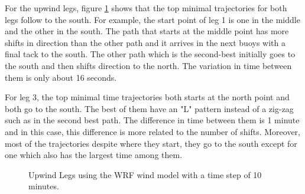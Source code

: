 For the upwind legs, figure \ref{fig:Windnetcdf_upwind} shows that the top minimal trajectories for both legs follow to the south. For example, the start point of leg 1 is one in the middle and the other in the south. The path that starts at the middle point has more shifts in direction than the other path and it arrives in the next buoys with a final tack to the south. The other path which is the second-best initially goes to the south and then shifts direction to the north. The variation in time between them is only about 16 seconds. \par \noindent 

For leg 3, the top minimal time trajectories both starts at the north point and both go to the south. The best of them have an "L" pattern instead of a zig-zag such as in the second best path. The difference in time between them is 1 minute and in this case, this difference is more related to the number of shifts. Moreover, most of the trajectories despite where they start, they go to the south except for one which also has the largest time among them. \par  %

\begin{figure} [hbt!]
  \centering
  \hfill
  \caption{Upwind Legs using the WRF wind model with a time step of 10 minutes.} %
\label{fig:Windnetcdf_upwind}
\end{figure}

